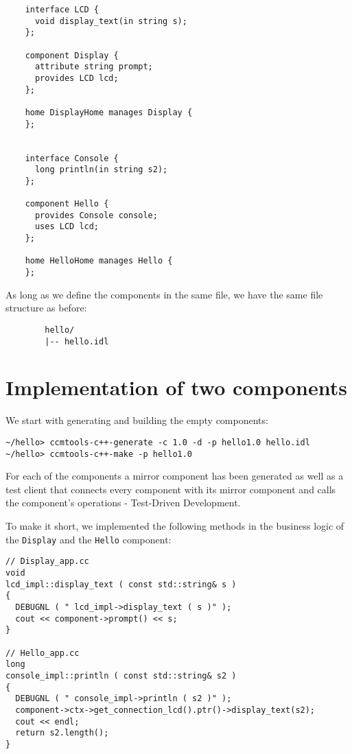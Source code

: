 \begin{verbatim}
    interface LCD {
      void display_text(in string s);
    };

    component Display {
      attribute string prompt;
      provides LCD lcd;
    };

    home DisplayHome manages Display {
    };


    interface Console {
      long println(in string s2);
    };

    component Hello {
      provides Console console;
      uses LCD lcd;
    };

    home HelloHome manages Hello {
    };
\end{verbatim}

\noindent
As long as we define the components in the same file, we have the same file
structure as before:
\begin{verbatim}
        hello/
        |-- hello.idl
\end{verbatim}



\section{Implementation of two components}

We start with generating and building the empty components:
\begin{verbatim}
~/hello> ccmtools-c++-generate -c 1.0 -d -p hello1.0 hello.idl
~/hello> ccmtools-c++-make -p hello1.0
\end{verbatim}

\noindent
For each of the components a mirror component has been generated as well as a
test client that connects every component with its mirror component and calls
the component's operations - Test-Driven Development.

To make it short, we implemented the following methods in the business logic of
the {\tt Display} and the {\tt Hello} component:
\begin{verbatim}
// Display_app.cc
void
lcd_impl::display_text ( const std::string& s )
{
  DEBUGNL ( " lcd_impl->display_text ( s )" );
  cout << component->prompt() << s;
}

// Hello_app.cc
long
console_impl::println ( const std::string& s2 )
{
  DEBUGNL ( " console_impl->println ( s2 )" );
  component->ctx->get_connection_lcd().ptr()->display_text(s2);
  cout << endl;
  return s2.length();	
}
\end{verbatim}

